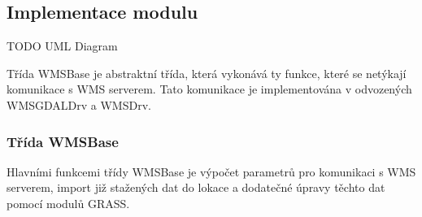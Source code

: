 \documentclass[a4paper,12pt]{article}
\begin{document}
\subsection{Implementace modulu}

TODO UML Diagram

Třída WMSBase je abstraktní třída, která vykonává ty funkce, které se netýkají komunikace s WMS serverem. Tato komunikace je implementována v odvozených WMSGDALDrv a WMSDrv.

\subsubsection{Třída WMSBase}


Hlavními funkcemi třídy WMSBase je výpočet parametrů pro komunikaci s WMS serverem, import již stažených dat do lokace a dodatečné úpravy těchto dat pomocí modulů GRASS. 
\end{document}
